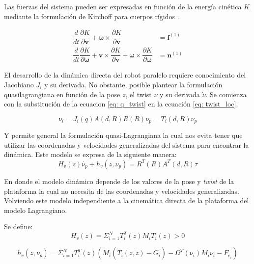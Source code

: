 Las fuerzas del sistema pueden ser expresadas en función de la 
energía cinética $K$ mediante la 
formulación de Kirchoff para cuerpos rígidos \cite{olguin20183d}.

\begin{subequations}\label{eq: kirchoff}
 \begin{align}
  \dfrac{d}{dt} \dfrac{\partial K}{\partial \mathbf v} + \boldsymbol \omega \times \dfrac{\partial K}{\partial \mathbf v} &= \mathbf f^{(1)}\\
  \dfrac{d}{dt} \dfrac{\partial K}{\partial \boldsymbol \omega} + \mathbf v \times \dfrac{\partial K}{\partial \mathbf v}  + \boldsymbol \omega \times \dfrac{\partial K}{\partial \boldsymbol \omega} &= \mathbf n^{(1)}
 \end{align}
\end{subequations}

El desarrollo de la dinámica directa del robot paralelo
requiere conocimiento del Jacobiano $J_i$ y su derivada.
No obstante, posible plantear la formulación quasilagrangiana
en función de la pose $z$, el twist $\nu$ y su derivada $\dot \nu$.
Se comienza con la substitución de la ecuacion 
\eqref{eq: q_twist} en la ecuación \eqref{eq: twist_loc}.

\begin{equation}
\nu_i = J_i(q) A(d,R) R(R) \nu_p = T_i(d,R) \nu_p
\end{equation}



Y permite general la formulación quasi-Lagrangiana la cual nos evita tener que utilizar las coordenadas y velocidades generalizadas del sistema para encontrar la dinámica. Este modelo se expresa de la siguiente manera:
\begin{equation}
H_v(z)\dot{\nu_p}+h_v(z,\nu_p) = R^T(R) A^T(d,R)\tau
\end{equation}

En donde el modelo dinámico depende de los valores de la pose y \emph{twist} de la plataforma la cual no necesita de las coordenadas y velocidades generalizadas. Volviendo este modelo independiente a la cinemática directa de la plataforma del modelo Lagrangiano.

Se define:
\begin{equation}
H_v(z) = \Sigma_{i=1}^N T_i^T(z)M_iT_i(z) > 0
\end{equation}

\begin{equation}
h_v(z,\nu_p) = \Sigma_{i=1}^N T_i^T(z) \left( M_i\left(\dot{T}_i(z,\dot{z}) - G_i\right) - \Omega^T(\nu_i)M_i\nu_i - F_{e_{i}} \right)
\end{equation}
